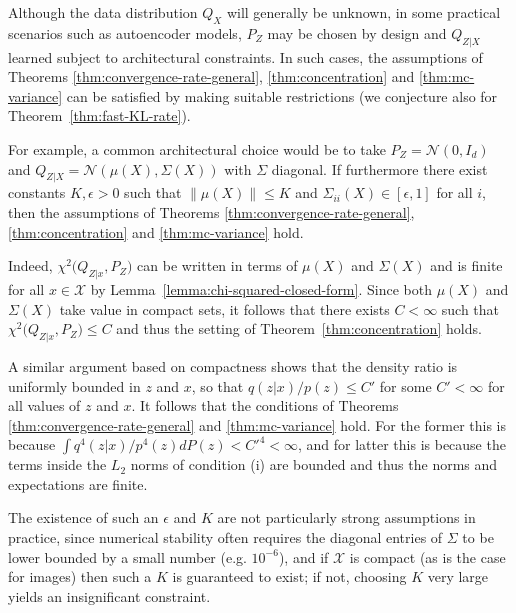 Although the data distribution $Q_X$ will generally be unknown, in some practical scenarios such as autoencoder models, $P_Z$ may be chosen by design and $Q_{Z|X}$ learned subject to architectural constraints.
In such cases, the assumptions of Theorems \ref{thm:convergence-rate-general}, \ref{thm:concentration} and \ref{thm:mc-variance} can be satisfied by making suitable restrictions (we conjecture also for Theorem~\ref{thm:fast-KL-rate}).

For example, a common architectural choice would be to take ${P_Z}={\mathcal{N}\left(0, I_d\right)}$ and ${Q_{Z|X}}={\mathcal{N}\left( \mu(X), \Sigma(X)\right)}$ with $\Sigma$ diagonal. 
If furthermore there exist constants $K, \epsilon > 0$ such that ${\| \mu(X)\| \leq K}$ and ${\Sigma_{ii}(X) \in [\epsilon, 1]}$ for all $i$, then the assumptions of Theorems \ref{thm:convergence-rate-general}, \ref{thm:concentration} and \ref{thm:mc-variance} hold.

Indeed, $\chi^2\bigl( Q_{Z|x}, P_Z\bigr)$ can be written in terms of $\mu(X)$ and $\Sigma(X)$ and is finite for all $x\in\mathcal{X}$ by Lemma~\ref{lemma:chi-squared-closed-form}.
Since both $\mu(X)$ and $\Sigma(X)$ take value in compact sets, it follows that there exists $C<\infty$ such that $\chi^2\bigl( Q_{Z|x}, P_Z\bigr) \leq C$ and thus the setting of Theorem~\ref{thm:concentration} holds.

A similar argument based on compactness shows that the density ratio is uniformly bounded in $z$ and $x$, so that $q(z|x)/p(z) \leq C'$ for some $C'<\infty$ for all values of $z$ and $x$. 
It follows that the conditions of Theorems \ref{thm:convergence-rate-general} and \ref{thm:mc-variance} hold.
For the former this is because $\int q^4(z|x)/p^4(z) dP(z) < {C'}^4 < \infty$, and for latter this is because the terms inside the $L_2$ norms of condition (i) are bounded and thus the norms and expectations are finite. 


The existence of such an $\epsilon$ and $K$ are not particularly strong assumptions in practice, since
numerical stability often requires the diagonal entries of $\Sigma$ to be lower bounded by a small number (e.g. $10^{-6}$), and
if $\mathcal{X}$ is compact (as is the case for images) then such a $K$ is guaranteed to exist; if not, choosing $K$ very large yields an insignificant constraint.


